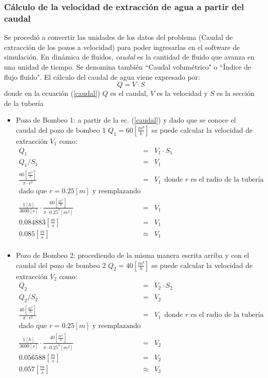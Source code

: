 \documentclass[10pt,a4paper,final]{article}
\begin{document}
\subsubsection{Cálculo de la velocidad de extracción de agua a partir del caudal}
Se procedió a convertir las unidades de los datos del problema (Caudal de extracción de los pozos a velocidad) para poder ingresarlas en el software de simulación.
En dinámica de fluidos, \emph{caudal} es la cantidad de fluido que avanza en una unidad de tiempo. Se denomina también ``Caudal volumétrico" o ``Índice de flujo fluido". El cálculo del caudal de agua viene expresado por:
\begin{equation}
Q=V \cdot S
\label{caudal}
\end{equation}
donde en la ecuación (\ref{caudal}) $Q$ es el caudal, $V$ es la velocidad y $S$ es la sección de la tubería
%
\begin{itemize}
\item Pozo de Bombeo 1: a partir de la ec. (\ref{caudal}) y dado que se conoce el caudal del pozo de bombeo 1 $Q_1=60 \left[\frac{m³}{h} \right]$ se puede calcular la velocidad de extracción $V_1$ como:\\
\begin{eqnarray*}
Q_1&=&V_1 \cdot S_1 \\
Q_1/S_1&=&V_1 \\
\frac{60 \left[\frac{m^3}{h}\right]}{\pi \cdot r^2} &=&V_1~~\textrm{donde $r$ es el radio de la tubería}\\
\mbox {dado que $r=0.25 \left[m\right]$ y reemplazando}\\
\frac{1 \left[h\right]}{3600 \left[s\right]}\cdot\frac{60 \left[\frac{m^3}{h}\right]}{\pi \cdot 0.25^2 [m^2]}&=&V_1 \\
0.084883 \left[\frac{m}{s}\right]& = & V_1\\
0.085 \left[\frac{m}{s}\right]&\approx& V_1\\
\end{eqnarray*}
\item Pozo de Bombeo 2: procediendo de la misma manera escrita arriba y con el caudal del pozo de bombeo 2 $Q_2=40 \left[\frac{m³}{h} \right]$ se puede calcular la velocidad de extracción $V_2$ como:\\
\begin{eqnarray*}
Q_2&=&V_2 \cdot S_2 \\
Q_2/S_2&=&V_2 \\
\frac{40 \left[\frac{m^3}{h}\right]}{\pi \cdot r^2} &=&V_1~~\textrm{donde $r$ es el radio de la tubería}\\
\mbox {dado que $r=0.25 \left[m\right]$ y reemplazando}\\
\frac{1 \left[h\right]}{3600 \left[s\right]}\cdot\frac{40 \left[\frac{m^3}{h}\right]}{\pi \cdot 0.25^2 [m^2]}&=&V_2 \\
0.056588 \left[\frac{m}{s}\right]& = & V_2\\
0.057 \left[\frac{m}{s}\right]&\approx& V_2\\
\end{eqnarray*}
\end{itemize}
\end{document}
